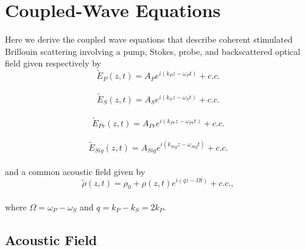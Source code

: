\documentclass[%
  reprint,
  superscriptaddress,
  amsmath,amssymb,
  aps,
  prapplied,
]{revtex4-2}
\begin{document}
\section{Coupled-Wave Equations}\label{Appendix:Coupled-Wave Equations}

Here we derive the coupled wave equations that describe coherent stimulated Brillouin scattering involving a pump, Stokes, probe, and backscattered optical field given respectively by
\\
\begin{equation}
    \tilde{E}_{P}(z,t) = A_{P}e^{i(k_{P}z - \omega_{P}t)} + c.c.
    \label{eq:Pump optical field}
\end{equation}
\\
\begin{equation}
    \tilde{E}_{S}(z,t) = A_{S}e^{i(k_{S}z - \omega_{S}t)} + c.c.
    \label{eq:Stokes optical field}
\end{equation}
\\
\begin{equation}
    \tilde{E}_{Pr}(z,t) = A_{Pr}e^{i(k_{Pr}z - \omega_{Pr}t)} + c.c.
    \label{eq:Probe optical field}
\end{equation}
\\
\begin{equation}
    \tilde{E}_{Sig}(z,t) = A_{Sig}e^{i(k_{Sig}z - \omega_{Sig}t)} + c.c.
    \label{eq:Signal optical field}
\end{equation}
\\
\noindent and a common acoustic field given by
\\
\begin{equation}
    \tilde{\rho}(z,t) = \rho_{0} + \rho(z,t)e^{i(qz - \Omega t)} + c.c.,
    \label{eq:acoustic field}
\end{equation}
\\
\noindent where $\Omega = \omega_{P} - \omega_{S}$ and $q = k_{P} - k_{S} = 2k_{P}$.


\subsection{Acoustic Field}\label{Coupled-Wave Equations:Acoustic Field}
\end{document}

